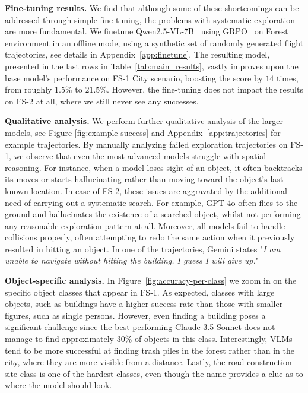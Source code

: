 \documentclass{article}
\theoremstyle{plain}
\theoremstyle{definition}
\theoremstyle{remark}
\newcommand{\challenge}{FS-1}
\newcommand{\hardchallenge}{FS-2}
\begin{document}
\textbf{Fine-tuning results.}
We find that although some of these shortcomings can be addressed through simple fine-tuning, the problems with systematic exploration are more fundamental.
We finetune Qwen2.5-VL-7B~\cite{bai2025qwen2} using GRPO~\cite{shao2024deepseekmath} on Forest environment in an offline mode, using a synthetic set of randomly generated flight trajectories, see details in Appendix~\ref{app:finetune}. The resulting model, presented in the last rows in Table~\ref{tab:main_results}, vastly improves upon the base model's performance on \challenge{} City scenario, boosting the score by $14$ times, from roughly $1.5\%$ to $21.5\%$. However, the fine-tuning does not impact the results on \hardchallenge{} at all, where we still never see any successes.

\textbf{Qualitative analysis.}
We perform further qualitative analysis of the larger models, see Figure \ref{fig:example-success} and Appendix~\ref{app:trajectories} for example trajectories. By manually analyzing failed exploration trajectories on \challenge{}, we observe that even the most advanced models struggle with spatial reasoning. For instance, when a model loses sight of an object, it often backtracks its moves or starts hallucinating rather than moving toward the object's last known location. In case of \hardchallenge{}, these issues are aggravated by the additional need of carrying out a systematic search. For example, GPT-4o often flies to the ground and hallucinates the existence of a searched object, whilst not performing any reasonable exploration pattern at all. Moreover, all models fail to handle collisions properly, often attempting to redo the same action when it previously resulted in hitting an object. In one of the trajectories, Gemini states "\textit{I am unable to navigate without hitting the building. I guess I will give up.}"







\textbf{Object-specific analysis.} In Figure~\ref{fig:accuracy-per-class} we zoom in on the specific object classes that appear in \challenge{}. As expected, classes with large objects, such as buildings have a higher success rate than those with smaller figures, such as single persons. However, even finding a building poses a significant challenge since the best-performing Claude 3.5 Sonnet does not manage to find approximately $30\%$ of objects in this class.
Interestingly, VLMs tend to be more successful at finding trash piles in the forest rather than in the city, where they are more visible from a distance. Lastly, the road construction site class is one of the hardest classes, even though the name provides a clue as to where the model should look.
\end{document}
